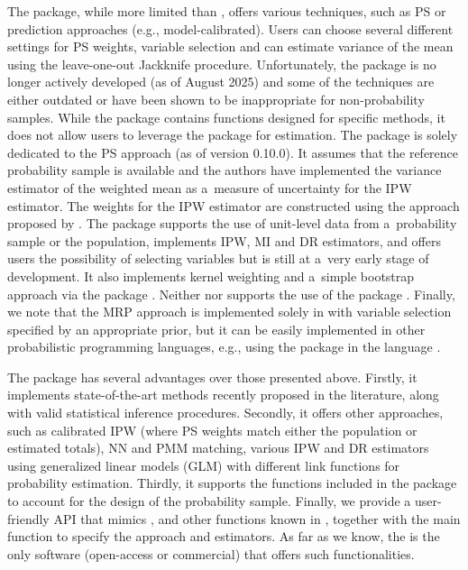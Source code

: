 \documentclass[
]{jss}
\begin{document}
The  package, while more limited than ,
offers various techniques, such as PS or prediction approaches (e.g.,
model-calibrated). Users can choose several different settings for PS
weights, variable selection and can estimate variance of the mean using
the leave-one-out Jackknife procedure. Unfortunately, the package is no
longer actively developed (as of August 2025) and some of the techniques
are either outdated or have been shown to be inappropriate for
non-probability samples. While the package contains functions designed
for specific methods, it does not allow users to leverage the
 package \citep{survey-pkg} for estimation. The
 package is solely dedicated to the PS approach (as of
version 0.10.0). It assumes that the reference probability sample is
available and the authors have implemented the variance estimator of the
weighted mean as a~measure of uncertainty for the IPW estimator. The
weights for the IPW estimator are constructed using the approach
proposed by \citet{Schonlau2017}. The  package supports the
use of unit-level data from a~probability sample or the population,
implements IPW, MI and DR estimators, and offers users the possibility
of selecting variables but is still at a~very early stage of
development. It also implements kernel weighting and a~simple bootstrap
approach via the  package \citep{scipy2020}. Neither
 nor  supports the use of the 
package \citep{Diallo2021}. Finally, we note that the MRP approach is
implemented solely in  with variable selection specified
by an appropriate prior, but it can be easily implemented in other
probabilistic programming languages, e.g., using the 
package \citep{turing} in the  language \citep{julia}.

The  package has several advantages over those presented
above. Firstly, it implements state-of-the-art methods recently proposed
in the literature, along with valid statistical inference procedures.
Secondly, it offers other approaches, such as calibrated IPW (where PS
weights match either the population or estimated totals), NN and PMM
matching, various IPW and DR estimators using generalized linear models
(GLM) with different link functions for probability estimation. Thirdly,
it supports the functions included in the  package to
account for the design of the probability sample. Finally, we provide a
user-friendly API that mimics , 
and other functions known in , together with the main
function to specify the approach and estimators. As far as we know, the
 is the only software (open-access or commercial) that
offers such functionalities.
\end{document}
